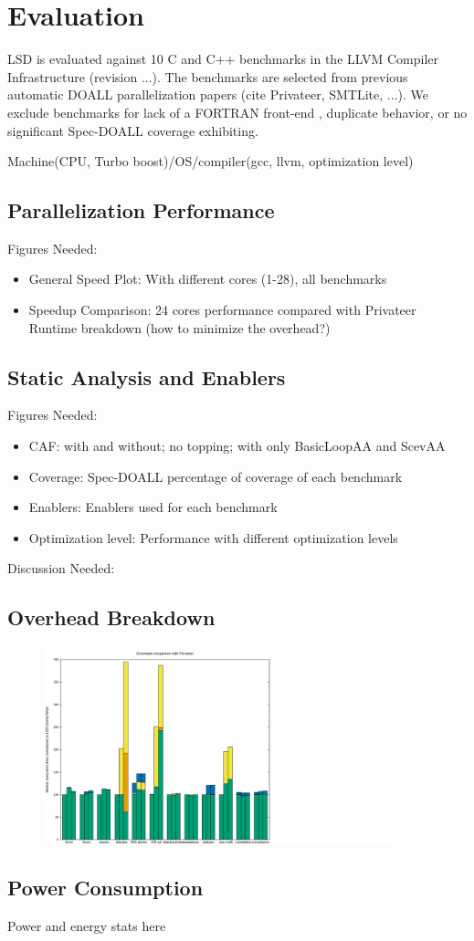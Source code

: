 \section{Evaluation}

LSD is evaluated against 10 C and C++ benchmarks in the LLVM Compiler
Infrastructure (revision ...). The benchmarks are selected from previous
automatic DOALL parallelization papers (cite Privateer, SMTLite, ...). We
exclude benchmarks for lack of a FORTRAN front-end , duplicate behavior, or
no significant Spec-DOALL coverage exhibiting.

Machine(CPU, Turbo boost)/OS/compiler(gcc, llvm, optimization level)


\subsection{Parallelization Performance}
Figures Needed:
\begin{itemize}
\item General Speed Plot: With different cores (1-28), all benchmarks
\item Speedup Comparison: 24 cores performance compared with Privateer
Runtime breakdown (how to minimize the overhead?)

\end{itemize}


\subsection{Static Analysis and Enablers}
Figures Needed:
\begin{itemize}
\item CAF: with and without; no topping; with only BasicLoopAA and ScevAA
\item Coverage: Spec-DOALL percentage of coverage of each benchmark
\item Enablers: Enablers used for each benchmark
\item Optimization level: Performance with different optimization levels
\end{itemize}

Discussion Needed:


\subsection{Overhead Breakdown}

\begin{figure}[htp]
  \includegraphics[width=0.9\textwidth]{figures/overheads}
\end{figure}

\subsection{Power Consumption}

Power and energy stats here

